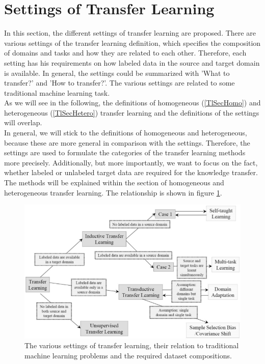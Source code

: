 \section{Settings of Transfer Learning}\label{DefTlSecSett} %
In this section, the different settings of transfer learning are proposed.
There are various settings of the transfer learning definition, which specifies the composition of domains and tasks and how they are related to each other.
Therefore, each setting has his requirements on how labeled data in the source and target domain is available.
In general, the settings could be summarized with 'What to transfer?' and 'How to transfer?'.
The various settings are related to some traditional machine learning task.\cite{Pan.2010}\\
As we will see in the following, the definitions of homogeneous (\ref{TlSecHomo}) and heterogeneous (\ref{TlSecHetero}) transfer learning and the definitions of the settings will overlap.\cite[p. 5-6]{Weiss.2016}\\
In general, we will stick to the definitions of homogeneous and heterogeneous, because these are more general in comparison with the settings.
Therefore, the settings are used to formulate the categories of the transfer learning methods more precisely.
Additionally, but more importantly, we want to focus on the fact, whether labeled or unlabeled target data are required for the knowledge transfer.
The methods will be explained within the section of homogeneous and heterogeneous transfer learning.
The relationship is shown in figure \ref{FigSettingsTransferLearning}.
\begin{figure}
	\centering
	\includegraphics[width=.8\linewidth]{figures/SettingsTransferLearning.png}
	\caption[Settings of Transfer Learning]{The various settings of transfer learning, their relation to traditional machine learning problems and the required dataset compositions.\cite{Pan.2010}}
	\label{FigSettingsTransferLearning}
\end{figure}

